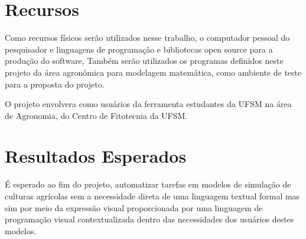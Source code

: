 \documentclass[12pt]{article}
\begin{document}
	
	\section{Recursos}
	
	Como recursos físicos serão utilizados nesse trabalho, o computador pessoal do pesquisador e linguagens de programação e bibliotecas open source para a produção do software, Também serão utilizados os programas definidos neste projeto da área agronômica para modelagem matemática, como ambiente de teste para a proposta do projeto.

	O projeto envolvera como usuários da ferramenta estudantes da UFSM na área de Agronomia, do Centro de Fitotecnia da UFSM. 

	\section{Resultados Esperados}
	
	É esperado ao fim do projeto, automatizar tarefas em modelos de simulação de culturas agrícolas sem a necessidade direta de uma linguagem textual formal mas sim por meio da expressão visual proporcionada por uma linguagem de programação visual contextualizada dentro das necessidades dos usuários destes modelos. 

	
	
	
\end{document}
